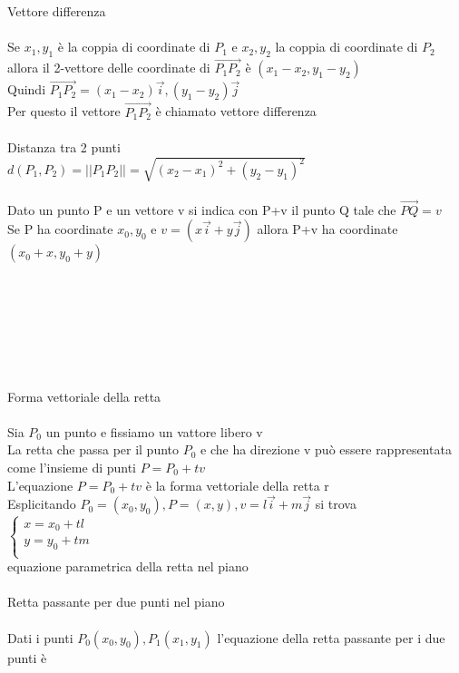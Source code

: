 \documentclass{article}
\begin{document}
{\large Vettore differenza}\\\\
Se \(x_1,y_1\) è la coppia di coordinate di \(P_1\) e \(x_2,y_2\) la coppia di coordinate di \(P_2\) allora il 2-vettore delle coordinate di \(\vec{P_1P_2}\) è \((x_1-x_2,y_1-y_2)\)\\
Quindi \(\vec{P_1P_2}= (x_1-x_2)\vec{i},(y_1-y_2)\vec{j}\)\\
Per questo il vettore \(\vec{P_1P_2}\) è chiamato vettore differenza\\\\
Distanza tra 2 punti\\
\(d(P_1,P_2)=\lvert\lvert P_1P_2\rvert\rvert=\sqrt{(x_2-x_1)^2+(y_2-y_1)^2}\)\\\\
Dato un punto P e un vettore v si indica con P+v il punto Q tale che \(\vec{PQ}=v\)\\
Se P ha coordinate \(x_0,y_0\) e \(v=(x\vec{i}+y\vec{j})\) allora P+v ha coordinate \((x_0+x,y_0+y)\)\\\\\\\\\\\\\\\\
{\large Forma vettoriale della retta}\\\\
Sia \(P_0\) un punto e fissiamo un vattore libero v\\
La retta che passa per il punto \(P_0\) e che ha direzione v può essere rappresentata come l'insieme di punti \(P=P_0+tv\)\\
L'equazione \(P=P_0+tv\) è la forma vettoriale della retta r\\
Esplicitando \(P_0=(x_0,y_0),P=(x,y),v=l\vec{i}+m\vec{j}\) si trova\\
\(
\begin{cases}
    x=x_0+tl\\
    y=y_0+tm\\
\end{cases}
\)\\
equazione parametrica della retta nel piano\\\\
Retta passante per due punti nel piano\\\\
Dati i punti \(P_0(x_0,y_0),P_1(x_1,y_1)\) l'equazione della retta passante per i due punti è\\
\end{document}
